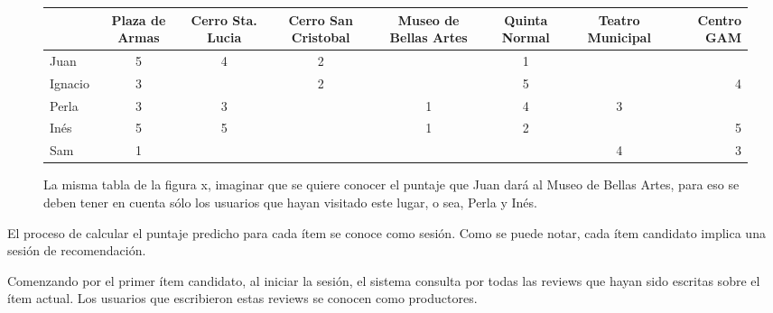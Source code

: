 \begin{figure}
\centering
\begin{adjustbox}{max width=\textwidth}
\begin{tabular}{l*{6}{c}r}
                  & Plaza de Armas & Cerro Sta. Lucia & Cerro San Cristobal & Museo de Bellas Artes & Quinta Normal  & Teatro Municipal & Centro GAM \\
\hline
\rowcolor{yellow} Juan          & 5 & 4 & 2 &   & 1 &   &   \\
\hline
Ignacio       & 3 &   & 2 &   & 5 &   & 4 \\
\hline
\rowcolor{yellow}Perla         & 3 & 3 &   & 1 & 4 & 3 &   \\
\hline
\rowcolor{yellow}Inés          & 5 & 5 &   & 1 & 2 &   & 5 \\
Sam          & 1 &  &   &  &  & 4  & 3 \\


\end{tabular}
\end{adjustbox}
\caption{La misma tabla de la figura x, imaginar que se quiere conocer el puntaje que Juan dará al Museo de Bellas Artes, para eso se deben tener en cuenta sólo los usuarios que hayan visitado este lugar, o sea, Perla y Inés.}

\end{figure}

El proceso de calcular el puntaje predicho para cada ítem se conoce como sesión. Como se puede notar, cada ítem candidato implica una sesión de recomendación.

Comenzando por el primer ítem candidato, al iniciar la sesión, el sistema consulta por todas las reviews que hayan sido escritas sobre el ítem actual. Los usuarios que escribieron estas reviews se conocen como productores.

